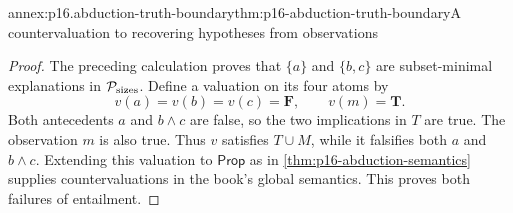 \begin{annexitem}{annex:p16.abduction-truth-boundary}{thm:p16-abduction-truth-boundary}{A countervaluation to recovering hypotheses from observations}
\begin{proof}
The preceding calculation proves that \(\{a\}\) and \(\{b,c\}\)
are subset-minimal explanations in \(\mathcal P_{\rm sizes}\).
Define a valuation on its four atoms by
\[
 v(a)=v(b)=v(c)=\mathbf{F},\qquad v(m)=\mathbf{T}.
\]
Both antecedents \(a\) and \(b\land c\) are false, so the two
implications in \(T\) are true. The observation \(m\) is also true.
Thus \(v\) satisfies \(T\cup M\), while it falsifies both
\(a\) and \(b\land c\). Extending this valuation to \(\mathsf{Prop}\)
as in \cref{thm:p16-abduction-semantics} supplies countervaluations in
the book's global semantics. This proves both failures of entailment.
\end{proof}
\end{annexitem}

